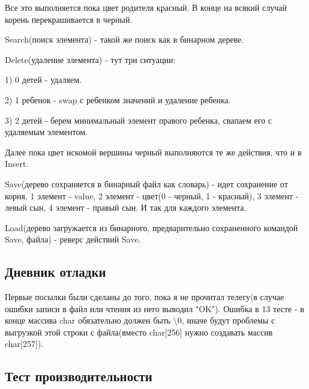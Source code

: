 \documentclass[12pt]{article}
\begin{document}
\noindent Все это выполняется пока цвет родителя красный. В конце на всякий случай корень перекрашивается
в черный.  

\noindent Search(поиск элемента) - такой же поиск как в бинарном дереве.  

\noindent Delete(удаление элемента) - тут три ситуации:  

1) 0 детей - удаляем.  

2) 1 ребенок - swap с ребенком значений и удаление ребенка.  

3) 2 детей - берем минимальный элемент правого ребенка, свапаем его с удаляемым элементом.  

\noindent Далее пока цвет искомой вершины черный выполняются те же действия, что и в Insert.

\noindent Save(дерево сохраняется в бинарный файл как словарь) - идет сохранение от корня, 1 элемент -
value, 2 элемент - цвет(0 - черный, 1 - красный), 3 элемент - левый сын, 4 элемент - правый сын. 
И так для каждого элемента.  

\noindent Load(дерево загружается из бинарного, предварительно сохраненного командой Save, файла) - реверс действий Save.  

\subsection*{Дневник отладки}

Первые посылки были сделаны до того, пока я не прочитал телегу(в случае ошибки записи в файл
или чтения из него выводил "OK"). Ошибка в 13 тесте - в конце массива char обязательно должен
быть \textbackslash0, иначе будут проблемы с выгрузкой этой строки с файла(вместо
char[256] нужно создавать массив char[257]).

\subsection*{Тест производительности}
\end{document}

